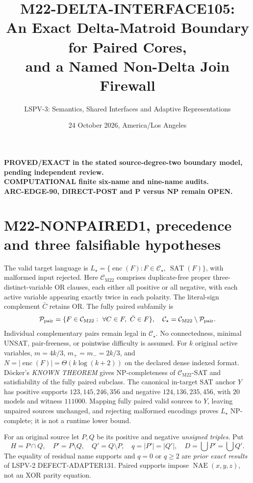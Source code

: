 \documentclass[11pt]{article}
\title{M22-DELTA-INTERFACE105:\\
An Exact Delta-Matroid Boundary for Paired Cores,\\
and a Named Non-Delta Join Firewall}
\author{LSPV-3: Semantics, Shared Interfaces and Adaptive Representations}
\date{24 October 2026, America/Los Angeles}
\newcommand{\CM}{\mathcal C_{\mathrm{M22}}}
\newcommand{\CS}{\mathcal C_{\star}}
\newcommand{\NAE}{\operatorname{NAE}}
\begin{document}
\maketitle
\begin{center}
\textbf{PROVED/EXACT in the stated source-degree-two boundary model, pending independent review.}\\
\textbf{COMPUTATIONAL finite six-name and nine-name audits.}\\
\textbf{ARC-EDGE-90, DIRECT-POST and P versus NP remain OPEN.}
\end{center}

\section{M22-NONPAIRED1, precedence and three falsifiable hypotheses}
The valid target language is $L_\star=\{\operatorname{enc}(F):F\in\CS,\ \operatorname{SAT}(F)\}$, with malformed input rejected. Here $\CM$ comprises duplicate-free proper three-distinct-variable OR clauses, each either all positive or all negative, with each active variable appearing exactly twice in each polarity. The literal-sign complement $\bar C$ retains OR. The fully paired subfamily is
\[
\mathcal P_{\rm pair}=\{F\in\CM:\ \forall C\in F,\ \bar C\in F\},
\quad \CS=\CM\setminus\mathcal P_{\rm pair}.
\]
Individual complementary pairs remain legal in $\CS$. No connectedness, minimal UNSAT, pair-freeness, or pointwise difficulty is assumed. For $k$ original active variables, $m=4k/3$, $m_+=m_-=2k/3$, and $N=|\operatorname{enc}(F)|=\Theta(k\log(k+2))$ on the declared dense indexed format. D\"ocker's \emph{KNOWN THEOREM} gives NP-completeness of $\CM$-SAT and satisfiability of the fully paired subclass. The canonical in-target SAT anchor $Y$ has positive supports $123,145,246,356$ and negative $124,136,235,456$, with $20$ models and witness $111000$. Mapping fully paired valid sources to $Y$, leaving unpaired sources unchanged, and rejecting malformed encodings proves $L_\star$ NP-complete; it is not a runtime lower bound.

For an original source let $P,Q$ be its positive and negative \emph{unsigned triples}. Put
\[
H=P\cap Q,\quad P'=P\setminus Q,\quad Q'=Q\setminus P,\quad
q=|P'|=|Q'|,\quad D=\bigcup P'=\bigcup Q'.
\]
The equality of residual name supports and $q=0$ or $q\ge2$ are \emph{prior exact results} of LSPV-2 DEFECT-ADAPTER131. Paired supports impose $\NAE(x,y,z)$, not an XOR parity equation.
\end{document}
